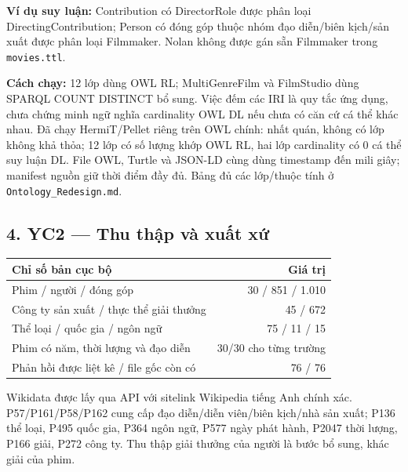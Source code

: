 \documentclass[
  11pt,
]{article}
\newcounter{none} %
\begin{document}
\textbf{Ví dụ suy luận:} Contribution có DirectorRole được phân loại
Directin\allowbreak{}g\allowbreak{}Contrib\allowbreak{}ution; Person có
đóng góp thuộc nhóm đạo diễn/biên kịch/sản xuất được phân loại
Filmmaker. Nolan không được gán sẵn Filmmaker trong
\texttt{movies.\allowbreak{}t\allowbreak{}tl}.

\textbf{Cách chạy:} 12 lớp dùng OWL RL;
Multi\allowbreak{}Gen\allowbreak{}re\allowbreak{}Film và FilmStudio dùng
SPARQL COUNT DISTINCT bổ sung. Việc đếm các IRI là quy tắc ứng dụng,
chưa chứng minh ngữ nghĩa cardinality OWL DL nếu chưa có căn cứ cá thể
khác nhau. Đã chạy
Hermi\allowbreak{}T/\allowbreak{}\allowbreak{}P\allowbreak{}ellet riêng
trên OWL chính: nhất quán, không có lớp không khả thỏa; 12 lớp có số
lượng khớp OWL RL, hai lớp cardinality có 0 cá thể suy luận DL. File
OWL, Turtle và JSON-LD cùng dùng timestamp đến mili giây; manifest nguồn
giữ thời điểm đầy đủ. Bảng đủ các lớp/thuộc tính ở
\texttt{Ontology\allowbreak{}\_\allowbreak{}\allowbreak{}Redesig\allowbreak{}n.\allowbreak{}md}.

\newpage

\subsection{4. YC2 --- Thu thập và xuất
xứ}\label{yc2-thu-thux1eadp-vuxe0-xuux1ea5t-xux1ee9}

{\def\LTcaptype{none} %
\begin{longtable}[]{@{}lr@{}}
\toprule\noalign{}
Chỉ số bản cục bộ & Giá trị \\
\midrule\noalign{}
\endhead
\bottomrule\noalign{}
\endlastfoot
Phim / người / đóng góp & 30 / 851 / 1.010 \\
Công ty sản xuất / thực thể giải thưởng & 45 / 672 \\
Thể loại / quốc gia / ngôn ngữ & 75 / 11 / 15 \\
Phim có năm, thời lượng và đạo diễn & 30/30 cho từng trường \\
Phản hồi được liệt kê / file gốc còn có & 76 / 76 \\
\end{longtable}
}

Wikidata được lấy qua API với sitelink Wikipedia tiếng Anh chính xác.
P57/\allowbreak{}\allowbreak{}P161\allowbreak{}/\allowbreak{}\allowbreak{}P58/\allowbreak{}\allowbreak{}P16\allowbreak{}2
cung cấp đạo diễn/diễn viên/biên kịch/nhà sản xuất; P136 thể loại, P495
quốc gia, P364 ngôn ngữ, P577 ngày phát hành, P2047 thời lượng, P166
giải, P272 công ty. Thu thập giải thưởng của người là bước bổ sung, khác
giải của phim.
\end{document}
